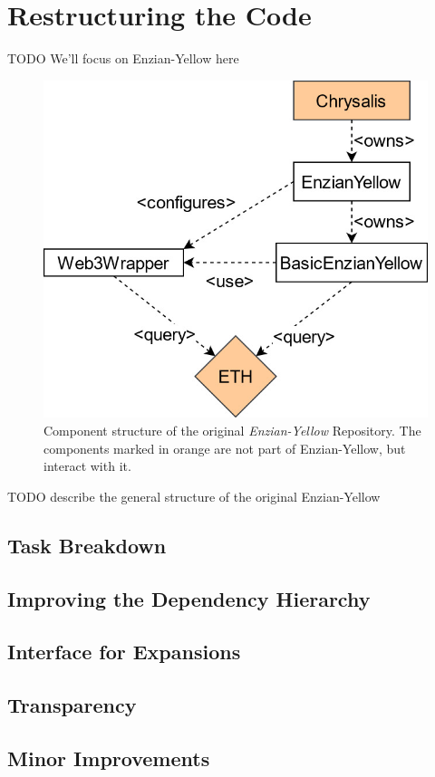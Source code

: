 %
\section{Restructuring the Code}
\label{sec:impr:enzian}

TODO We'll focus on Enzian-Yellow here

\begin{figure}[h]
	\centering
	\captionsetup{justification=centering,margin=2cm}
	\includegraphics[height=0.5\textwidth]{gfx/system-restructure-enzian-yellow-original}
	\caption{Component structure of the original \emph{Enzian-Yellow} Repository. The components marked in orange are not part of Enzian-Yellow, but interact with it.}
	\label{fig:impr:enzian:original}
\end{figure}

TODO describe the general structure of the original Enzian-Yellow

\subsection{Task Breakdown}

\subsection{Improving the Dependency Hierarchy}

\subsection{Interface for Expansions}

\subsection{Transparency}

\subsection{Minor Improvements}

